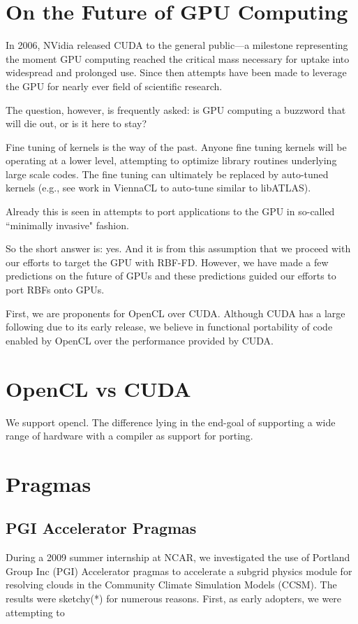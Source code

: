 \documentclass{report}
\begin{document}
\fi


\section{On the Future of GPU Computing}

In 2006, NVidia released CUDA to the general public---a milestone representing the moment GPU computing reached the critical mass necessary for uptake into widespread and prolonged use. Since then attempts have been made to leverage the GPU for nearly ever field of scientific research. 

The question, however, is frequently asked: is GPU computing a buzzword that will die out, or is it here to stay? 

Fine tuning of kernels is the way of the past. Anyone fine tuning kernels will be operating at a lower level, attempting to optimize library routines underlying large scale codes. The fine tuning can ultimately be replaced by auto-tuned kernels (e.g., see work in ViennaCL to auto-tune similar to libATLAS). 

Already this is seen in attempts to port applications to the GPU in so-called ``minimally invasive" fashion. 

So the short answer is: yes. And it is from this assumption that we proceed with our efforts to target the GPU with RBF-FD. However, we have made a few predictions on the future of GPUs and these predictions guided our efforts to port RBFs onto GPUs. 

First, we are proponents for OpenCL over CUDA. Although CUDA has a large following due to its early release, we believe in functional portability of code enabled by OpenCL over the performance provided by CUDA. 

\section{OpenCL vs CUDA}

We support opencl. The difference lying in the end-goal of supporting a wide range of hardware with a compiler as support for porting. 

\section{Pragmas}


\subsection{PGI Accelerator Pragmas}
During a 2009 summer internship at NCAR, we investigated the use of Portland Group Inc (PGI) Accelerator pragmas to accelerate a subgrid physics module for resolving clouds in the Community Climate Simulation Models (CCSM). The results were sketchy(*) for numerous reasons. First, as early adopters, we were attempting to  
\end{document}

